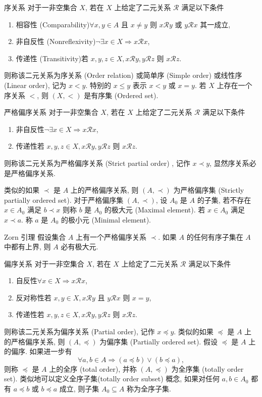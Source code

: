 \documentclass[cn,toc=twocol]{elegantbook}
\newcommand{\ITEMS}{\begin{enumerate}}
\newcommand{\ITEME}{\end{enumerate}}
\begin{document}
\begin{definition}{序关系}
对于一非空集合 $X$, 若在 $X$ 上给定了二元关系 $\mathcal{R}$ 满足以下条件
\ITEMS
	\item 相容性 (Comparability)\quad $ \forall x, y \in A$ 且 $x \neq y$ 则 $x\mathcal{R}y$ 或 $y\mathcal{R}x$ 其一成立, 
	\item 非自反性 (Nonreflexivity)\quad $\neg\exists x\in X \Rightarrow x\mathcal{R}x$,
	\item 传递性 (Transitivity)\quad 若 $x, y, z\in X ,  x\mathcal{R}y,  y\mathcal{R}z$ 则 $x\mathcal{R}z$.
\ITEME 
则称该二元关系为序关系 (Order relation) 或简单序 (Simple order) 或线性序 (Linear order), 记为 $x < y$. 特别的 $x \le y$ 表示 $x < y$ 或 $x = y$. 若 $X$ 上存在一个序关系 $<$, 则 $(X,<)$ 是有序集 (Ordered set).
\end{definition}

\begin{definition}{严格偏序关系}
对于一非空集合 $X$, 若在 $X$ 上给定了二元关系 $\mathcal{R}$ 满足以下条件
\ITEMS
	\item 非自反性\quad \quad $\neg\exists x\in X \Rightarrow x\mathcal{R}x$,
	\item 传递性\quad 若 $x, y, z\in X ,  x\mathcal{R}y,  y\mathcal{R}z$ 则 $x\mathcal{R}z$.
\ITEME 
则称该二元关系为严格偏序关系 (Strict partial order) , 记作 $x \prec y$, 显然序关系必是严格偏序关系. 

类似的如果 $\prec$ 是 $A$ 上的严格偏序关系, 则 $(A,\prec)$ 为严格偏序集 (Strictly partially ordered set). 对于严格偏序集 $(A,\prec)$, 设 $A_0$ 是 $A$ 的子集, 若不存在 $x \in A_0$ 满足 $b\prec x$ 则称 $b$ 是 $A_0$ 的极大元 (Maximal element). 若 $x \in A_0$ 满足 $x\prec a$. 称 $a$ 是 $A_0$ 的极小元 (Minimal element).
\end{definition}

\begin{lemma}{Zorn 引理}
假设集合 $A$ 上有一个严格偏序关系 $\prec$. 如果 $A$ 的任何有序子集在 $A$ 中都有上界, 则 $A$ 必有极大元.
\end{lemma}

\begin{definition}{偏序关系}
对于一非空集合 $X$, 若在 $X$ 上给定了二元关系 $\mathcal{R}$ 满足以下条件
\ITEMS
	\item 自反性\quad $\forall x\in X \Rightarrow x\mathcal{R}x$,
	\item 反对称性\quad 若 $x, y\in X ,  x\mathcal{R}y$ 且 $y\mathcal{R}x$ 则 $x=y$,
	\item 传递性\quad 若 $x, y, z\in X ,  x\mathcal{R}y,  y\mathcal{R}z$ 则 $x\mathcal{R}z$.
\ITEME 
则称该二元关系为偏序关系 (Partial order), 记作 $x \preccurlyeq y$. 类似的如果 $\preccurlyeq$ 是 $A$ 上的严格偏序关系, 则 $(A,\preccurlyeq)$ 为偏序集 (Partially ordered set). 假设 $\preccurlyeq$ 是 $A$ 上的偏序. 如果进一步有
\[
	\forall a,b \in A \Rightarrow (a \preccurlyeq b) \lor (b \preccurlyeq a),
\]
则称 $\preccurlyeq$ 是 $A$ 上的全序 (total order), 并称 $(A,\preccurlyeq)$ 为全序集 (totally order set). 类似地可以定义全序子集(totally order subset) 概念, 如果对任何 $a,b \in A_0$ 都有 $a \preccurlyeq b$ 或 $b \preccurlyeq a$ 成立, 则子集 $A_0 \subseteq A$ 称为全序子集.
\end{definition}
\end{document}
